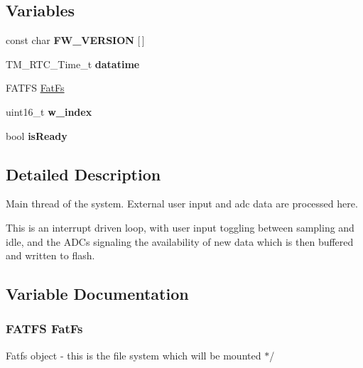 \subsection*{Variables}
\begin{DoxyCompactItemize}
\item 
\hypertarget{group__main_gac580b6f60fe65da80a8f235ed3f7c602}{}const char {\bfseries F\+W\+\_\+\+V\+E\+R\+S\+I\+O\+N} \mbox{[}$\,$\mbox{]}\label{group__main_gac580b6f60fe65da80a8f235ed3f7c602}

\item 
\hypertarget{group__main_ga81ef1a18c6d2e58fa58d50797d5e3840}{}T\+M\+\_\+\+R\+T\+C\+\_\+\+Time\+\_\+t {\bfseries datatime}\label{group__main_ga81ef1a18c6d2e58fa58d50797d5e3840}

\item 
F\+A\+T\+F\+S \hyperlink{group__main_ga8f47e042c2aca024c6534fdf5c3d9426}{Fat\+Fs}
\item 
\hypertarget{group__main_ga5f56222f10a6cb328eaf759e2795117c}{}uint16\+\_\+t {\bfseries w\+\_\+index}\label{group__main_ga5f56222f10a6cb328eaf759e2795117c}

\item 
\hypertarget{group__main_ga1f1586f3013bbd3b99be7275eec73e76}{}bool {\bfseries is\+Ready}\label{group__main_ga1f1586f3013bbd3b99be7275eec73e76}

\end{DoxyCompactItemize}


\subsection{Detailed Description}
Main thread of the system. External user input and adc data are processed here. 

This is an interrupt driven loop, with user input toggling between sampling and idle, and the A\+D\+Cs signaling the availability of new data which is then buffered and written to flash. 

\subsection{Variable Documentation}
\hypertarget{group__main_ga8f47e042c2aca024c6534fdf5c3d9426}{}
\subsubsection[{Fat\+Fs}]{\setlength{\rightskip}{0pt plus 5cm}F\+A\+T\+F\+S Fat\+Fs}\label{group__main_ga8f47e042c2aca024c6534fdf5c3d9426}

\begin{DoxyItemize}
\item Fatfs object -\/ this is the file system which will be mounted $\ast$/ 
\end{DoxyItemize}